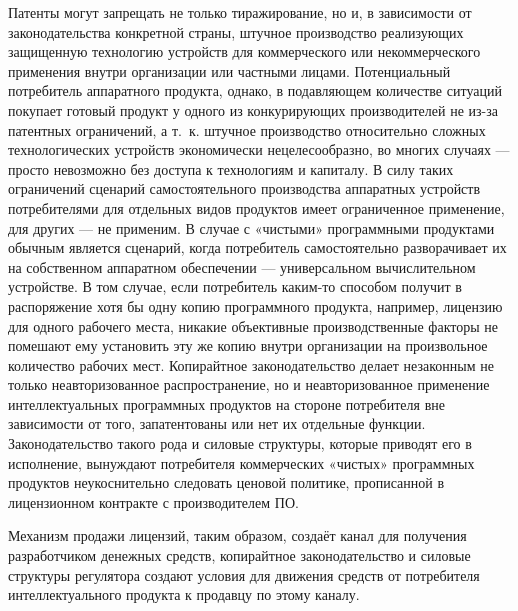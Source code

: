 \documentclass{article}
\begin{document}
Патенты могут запрещать не только тиражирование, но и, в зависимости от законодательства конкретной страны, штучное производство реализующих защищенную технологию устройств для коммерческого или некоммерческого применения внутри организации или частными лицами. Потенциальный потребитель аппаратного продукта, однако, в подавляющем количестве ситуаций покупает готовый продукт у одного из конкурирующих производителей не из-за патентных ограничений, а т.~к. штучное производство относительно сложных технологических устройств экономически нецелесообразно, во многих случаях — просто невозможно без доступа к технологиям и капиталу. В силу таких ограничений сценарий самостоятельного производства аппаратных устройств потребителями для отдельных видов продуктов имеет ограниченное применение, для других — не применим. В случае с «чистыми» программными продуктами обычным является сценарий, когда потребитель самостоятельно разворачивает их на собственном аппаратном обеспечении — универсальном вычислительном устройстве. В том случае, если потребитель каким-то способом получит в распоряжение хотя бы одну копию программного продукта, например, лицензию для одного рабочего места, никакие объективные производственные факторы не помешают ему установить эту же копию внутри организации на произвольное количество рабочих мест. Копирайтное законодательство делает незаконным не только неавторизованное распространение, но и неавторизованное применение интеллектуальных программных продуктов на стороне потребителя вне зависимости от того, запатентованы или нет их отдельные функции. Законодательство такого рода и силовые структуры, которые приводят его в исполнение, вынуждают потребителя коммерческих «чистых» программных продуктов неукоснительно следовать ценовой политике, прописанной в лицензионном контракте с производителем ПО.

Механизм продажи лицензий, таким образом, создаёт канал для получения разработчиком денежных средств, копирайтное законодательство и силовые структуры регулятора создают условия для движения средств от потребителя интеллектуального продукта к продавцу по этому каналу.
\end{document}
